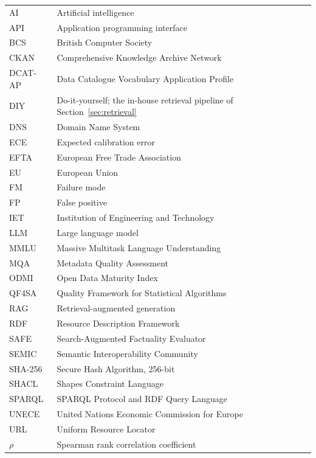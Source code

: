 \begin{tabular}{@{}p{2.8cm}p{\dimexpr\textwidth-3.4cm\relax}@{}}
AI & Artificial intelligence \\
API & Application programming interface \\
BCS & British Computer Society \\
CKAN & Comprehensive Knowledge Archive Network \\
DCAT-AP & Data Catalogue Vocabulary Application Profile \\
DIY & Do-it-yourself; the in-house retrieval pipeline of Section~\ref{sec:retrieval} \\
DNS & Domain Name System \\
ECE & Expected calibration error \\
EFTA & European Free Trade Association \\
EU & European Union \\
FM & Failure mode \\
FP & False positive \\
IET & Institution of Engineering and Technology \\
LLM & Large language model \\
MMLU & Massive Multitask Language Understanding \\
MQA & Metadata Quality Assessment \\
ODMI & Open Data Maturity Index \\
QF4SA & Quality Framework for Statistical Algorithms \\
RAG & Retrieval-augmented generation \\
RDF & Resource Description Framework \\
SAFE & Search-Augmented Factuality Evaluator \\
SEMIC & Semantic Interoperability Community \\
SHA-256 & Secure Hash Algorithm, 256-bit \\
SHACL & Shapes Constraint Language \\
SPARQL & SPARQL Protocol and RDF Query Language \\
UNECE & United Nations Economic Commission for Europe \\
URL & Uniform Resource Locator \\
$\rho$ & Spearman rank correlation coefficient \\
\end{tabular}
